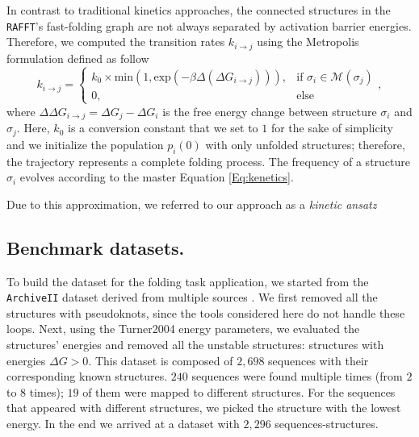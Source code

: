 In contrast to traditional kinetics approaches, the connected structures in the \texttt{RAFFT}'s fast-folding graph are not always separated by activation barrier energies. Therefore, we computed the transition rates $k_{i\rightarrow j}$ using the Metropolis \cite{klemm2008funnels} formulation defined as follow
\begin{equation}
\label{Eq:metropolis}
k_{i\rightarrow j} = \begin{cases}
k_0 \times \text{min}(1, \text{exp}(-\beta \Delta (\Delta G_{i \rightarrow j}))),& \text{if } \sigma_i \in \mathcal{M}(\sigma_j) \\
0,& \text{else }
\end{cases},
\end{equation}
where \(\Delta \Delta G_{i\rightarrow j} = \Delta G_j - \Delta G_i\) is the free energy change between structure \(\sigma_i\) and \(\sigma_j\). Here, \(k_0\) is a conversion constant that we set to $1$ for the sake of simplicity and we initialize the population \(p_i(0)\) with only unfolded structures; therefore, the trajectory represents a complete folding process. The frequency of a structure \(\sigma_i\) evolves according to the master Equation \ref{Eq:kenetics}.

Due to this approximation, we referred to our approach as a \textit{kinetic ansatz}
\subsection{Benchmark datasets. }

To build the dataset for the folding task application, we started from the \texttt{ArchiveII} dataset derived from multiple sources \cite{andronescu08_rna_stran,brown98_ribon_p_datab,bellaousov10_probk,daub08_rna_wikip,damberger94_compar_datab_group_i_intron_struc,zwieb00_tmrdb,zwieb03_tmrdb,waring84_asses_model_intron_rna_secon,specht97_compil_rrna_rrna_gene_sequen,sprinzl98_compil_trna_sequen_sequen_trna_genes,sloma16_exact_calcul_loop_format_probab,schnare96_compr_compar_struc_charac_eukar,mathews99_expan_sequen_depen_therm_param,samuelsson99_signal_recog_partic_datab_srpdb,gutell93_compil_large_subun_like_ribos_rna_struc,gutell94_collec_small_subun_like_ribos_rna_struc,gardner09_rfam}. We first removed all the structures with pseudoknots, since the tools considered here do not handle these loops. Next, using the Turner2004 energy parameters, we evaluated the structures' energies and removed all the unstable structures: structures with energies $\Delta G > 0$. This dataset is composed of $2,698$ sequences with their corresponding known structures. $240$ sequences were found multiple times (from $2$ to $8$ times); $19$ of them were mapped to different structures. For the sequences that appeared with different structures, we picked the structure with the lowest energy. In the end we arrived at a dataset with $2,296$ sequences-structures.

